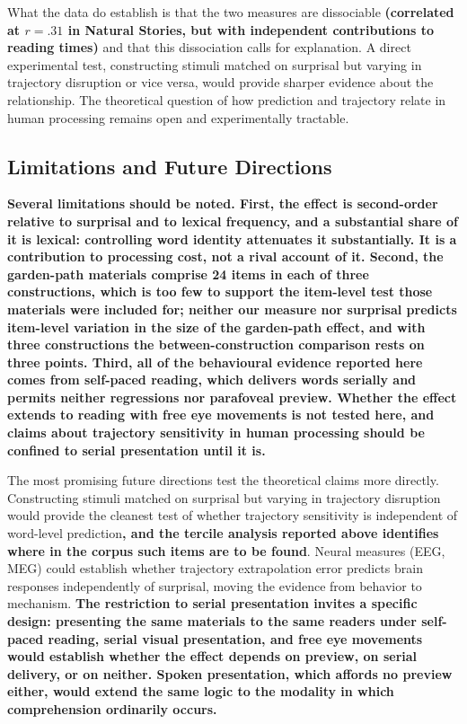 \documentclass[12pt]{article}
\newcommand{\new}[1]{{\bfseries #1}}
\begin{document}
What the data do establish is that the two measures are dissociable \new{(correlated at $r = .31$ in Natural Stories, but with independent contributions to reading times)} and that this dissociation calls for explanation. A direct experimental test, constructing stimuli matched on surprisal but varying in trajectory disruption or vice versa, would provide sharper evidence about the relationship. The theoretical question of how prediction and trajectory relate in human processing remains open and experimentally tractable.

\subsection{Limitations and Future Directions}

\new{Several limitations should be noted. First, the effect is second-order relative to surprisal and to lexical frequency, and a substantial share of it is lexical: controlling word identity attenuates it substantially. It is a contribution to processing cost, not a rival account of it. Second, the garden-path materials comprise 24 items in each of three constructions, which is too few to support the item-level test those materials were included for; neither our measure nor surprisal predicts item-level variation in the size of the garden-path effect, and with three constructions the between-construction comparison rests on three points. Third, all of the behavioural evidence reported here comes from self-paced reading, which delivers words serially and permits neither regressions nor parafoveal preview. Whether the effect extends to reading with free eye movements is not tested here, and claims about trajectory sensitivity in human processing should be confined to serial presentation until it is.}

The most promising future directions test the theoretical claims more directly. Constructing stimuli matched on surprisal but varying in trajectory disruption would provide the cleanest test of whether trajectory sensitivity is independent of word-level prediction\new{, and the tercile analysis reported above identifies where in the corpus such items are to be found}. Neural measures (EEG, MEG) could establish whether trajectory extrapolation error predicts brain responses independently of surprisal, moving the evidence from behavior to mechanism. \new{The restriction to serial presentation invites a specific design: presenting the same materials to the same readers under self-paced reading, serial visual presentation, and free eye movements would establish whether the effect depends on preview, on serial delivery, or on neither. Spoken presentation, which affords no preview either, would extend the same logic to the modality in which comprehension ordinarily occurs.}
\end{document}

